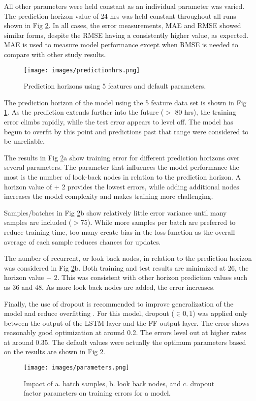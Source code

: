 \begin{linenumbers}
%
All other parameters were held constant as an individual parameter was varied. The prediction horizon value of 24 hrs was held constant throughout all runs shown in  Fig \ref{fig:parameters}. In all cases, the error measurements, MAE and RMSE showed similar forms, despite the RMSE having a consistently higher value, as expected. MAE is used to measure model performance except when RMSE is needed to compare with other study results.  

%
\begin{figure}[!htb]
\centering
\texttt{[image: images/predictionhrs.png]}  %
\caption{Prediction horizons using 5 features and default parameters.}
\label{fig:predictionhrs}
\end{figure}
%
The prediction horizon of the model using the 5 feature data set is shown in Fig \ref{fig:predictionhrs}.  As the prediction extends further into the future ($>$ 80 hrs), the training error climbs rapidly, while the test error appears to level off. The model has begun to overfit by this point and predictions past that range were considered to be unreliable.

The results in  Fig \ref{fig:parameters}a show training error for different prediction horizons over several parameters. The parameter that influences the model performance the most is the number of look-back nodes in relation to the prediction horizon. A horizon value of + 2 provides the lowest errors, while adding additional nodes increases the model complexity and makes training more challenging. 

Samples/batches in Fig \ref{fig:parameters}b show relatively little error variance until many samples are included ($>$75). While more samples per batch are preferred to reduce training time, too many create bias in the loss function as the overall average of each sample reduces chances for updates.

The number of recurrent, or look back nodes, in relation to the prediction horizon was considered in  Fig \ref{fig:parameters}b. Both training and test results are minimized at 26, the horizon value + 2. This was consistent with other horizon prediction values such as 36 and 48. As more look back nodes are added, the error increases.

Finally, the use of dropout is recommended to improve generalization of the model and reduce overfitting \citep{Gal2016}. For this model, dropout ($\in 0,1$) was applied only between the output of the LSTM layer and the FF output layer. The error shows reasonably good optimization at around 0.2. The errors level out at higher rates at around 0.35. The default values were actually the optimum parameters based on the results are shown in Fig \ref{fig:parameters}.
%
\begin{figure}[!htb]
\centering
\texttt{[image: images/parameters.png]}  %
\caption[Impact of model parameters on training error]{Impact of a. batch samples, b. look back nodes, and c. dropout factor parameters on training errors for a model.}
\label{fig:parameters}
\end{figure}
%


\end{linenumbers}
